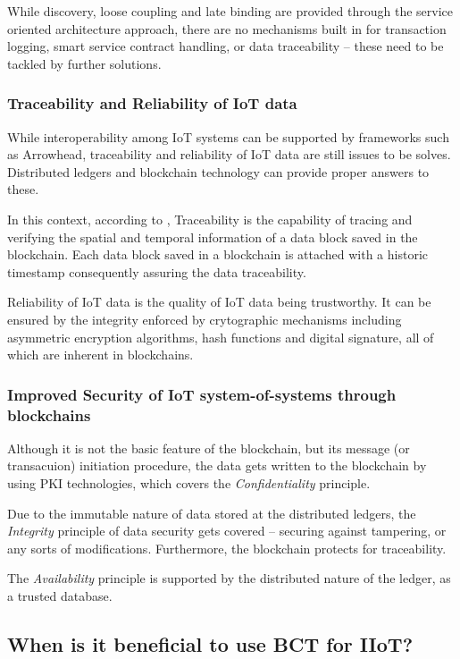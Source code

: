 \documentclass[a4paper]{article}
\begin{document}
While discovery, loose coupling and late binding are provided through the service oriented architecture approach, there are no mechanisms built in for transaction logging, smart service contract handling, or data traceability -- these need to be tackled by further solutions.  

\subsubsection{Traceability and Reliability of IoT data}

While interoperability among IoT systems can be supported by frameworks such as Arrowhead, traceability and reliability of IoT data are still issues to be solves. Distributed ledgers and blockchain technology can provide proper answers to these.

In this context, according to \cite{BC_IoT_survey}, Traceability is the capability of tracing and verifying the spatial and temporal information of a data block saved in the blockchain. Each data block saved in a blockchain is attached with a historic timestamp consequently assuring the data traceability. 

Reliability of IoT data \cite{BC_IoT_survey} is the quality of IoT data being trustworthy. It can be ensured by the integrity enforced by crytographic mechanisms including asymmetric encryption algorithms, hash functions and digital signature, all of which are inherent in blockchains.

\subsubsection{Improved Security of IoT system-of-systems through blockchains}
Although it is not the basic feature of the blockchain, but its message (or transacuion) initiation procedure, the data gets written to the blockchain by using PKI technologies, which covers the \emph{Confidentiality} principle.

Due to the immutable nature of data stored at the distributed ledgers, the \emph{Integrity} principle of data security gets covered -- securing against tampering, or any sorts of modifications. Furthermore, the blockchain protects for traceability.

The \emph{Availability} principle is supported by the distributed nature of the ledger, as a trusted database.

\subsection{When is it beneficial to use BCT for IIoT?}
\end{document}
